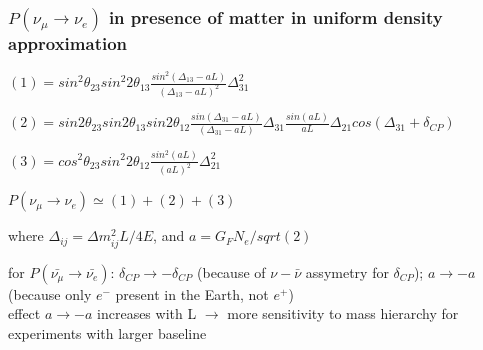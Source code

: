 \begin{frame}\frametitle{$P(\nu_\mu \rightarrow \nu_e)$ in presence of matter in uniform density approximation  \cite{ref_LBNFdoc_volume-physics}}
\scriptsize

\begin{center}
\scriptsize $ (1) = sin^2{\theta_{23}}sin^2{2\theta_{13}}\frac{sin^2(\Delta_{13}-aL)}{(\Delta_{13}-aL)^2}\Delta^2_{31}$\\
\end{center}

\begin{center}
\scriptsize $ (2) = sin2\theta_{23}sin2\theta_{13}sin2\theta_{12}\frac{sin(\Delta_{31}-aL)}{(\Delta_{31}-aL)}\Delta_{31}\frac{sin(aL)}{aL}\Delta_{21}cos(\Delta_{31}+\delta_{CP})$\\
\end{center}

\begin{center}
\scriptsize $ (3) = cos^2\theta_{23}sin^2{2\theta_{12}}\frac{sin^2(aL)}{(aL)^2}\Delta^2_{21}$\\
\end{center}

\begin{center}
\scriptsize $P(\nu_\mu \rightarrow \nu_e) \simeq (1) + (2) + (3)$\\
\end{center}

\begin{center}
\scriptsize where $\Delta_{ij}={\Delta}m^2_{ij}L/4E$, and $a={G_F}{N_e}/sqrt(2)$\\
\end{center}

\scriptsize 
\scriptsize for $P(\bar{\nu_\mu} \rightarrow \bar{\nu_e})$: $\delta_{CP} \rightarrow -\delta_{CP}$ ({\tiny because of $\nu-\bar{\nu}$ assymetry for $\delta_{CP}$}); $a \rightarrow -a$ ({\tiny because only $e^-$ present in the Earth, not $e^+$})\\
\scriptsize effect $a \rightarrow -a$ increases with L $\rightarrow$ more sensitivity to mass hierarchy for experiments with larger baseline
\end{frame}
